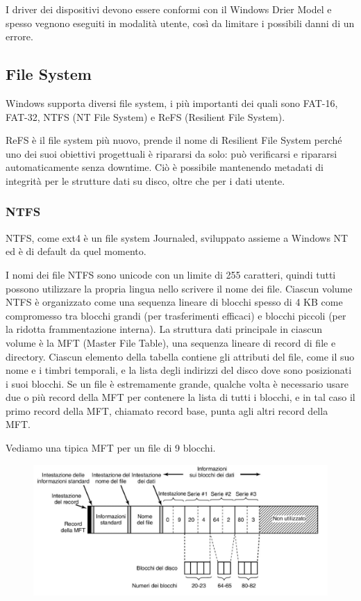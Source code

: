I driver dei dispositivi devono essere conformi con il Windows Drier Model e spesso vegnono eseguiti in modalità utente, così da limitare i possibili danni di un errore.

\subsection{File System}
Windows supporta diversi file system, i più importanti dei quali sono FAT-16, FAT-32, NTFS (NT File System) e ReFS (Resilient File System).

ReFS è il file system più nuovo, prende il nome di Resilient File System perché uno dei suoi obiettivi progettuali è ripararsi da solo: può verificarsi e ripararsi automaticamente senza downtime.
Ciò è possibile mantenendo metadati di integrità per le strutture dati su disco, oltre che per i dati utente.

\subsubsection{NTFS}
NTFS, come ext4 è un file system Journaled, sviluppato assieme a Windows NT ed è di default da quel momento.

\spacer
I nomi dei file NTFS sono unicode con un limite di 255 caratteri, quindi tutti possono utilizzare la propria lingua nello scrivere il nome dei file.
\spacer
Ciascun volume NTFS è organizzato come una sequenza lineare di blocchi spesso di 4 KB come compromesso tra blocchi grandi (per trasferimenti efficaci) e blocchi piccoli (per la ridotta frammentazione interna).
\spacer
La struttura dati principale in ciascun volume è la MFT (Master File Table), una sequenza lineare di record di file e directory.
Ciascun elemento della tabella contiene gli attributi del file, come il suo nome e i timbri temporali, e la lista degli indirizzi del disco dove sono posizionati i suoi blocchi. Se un file è estremamente grande, qualche volta è necessario usare due o più record della MFT per contenere la lista di tutti i blocchi, e in tal caso il primo record della MFT, chiamato record base, punta agli altri record della MFT.

\spacer
Vediamo una tipica MFT per un file di 9 blocchi.
\begin{figure}[H]
    \centering
    \includegraphics[width=0.75\linewidth]{assets/Windows-MFT.png}
\end{figure}

